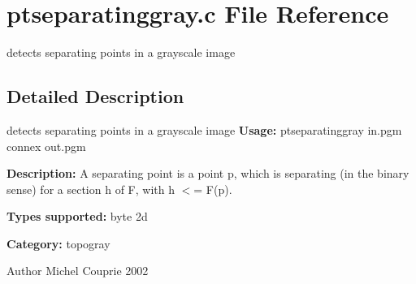 \section{ptseparatinggray.c File Reference}
\label{ptseparatinggray_8c}


detects separating points in a grayscale image  




\subsection{Detailed Description}
detects separating points in a grayscale image {\bfseries Usage:} ptseparatinggray in.pgm connex out.pgm

{\bfseries Description:} A separating point is a point p, which is separating (in the binary sense) for a section h of F, with h $<$= F(p).

{\bfseries Types supported:} byte 2d

{\bfseries Category:} topogray

\begin{DoxyAuthor}{Author}
Michel Couprie 2002 
\end{DoxyAuthor}
